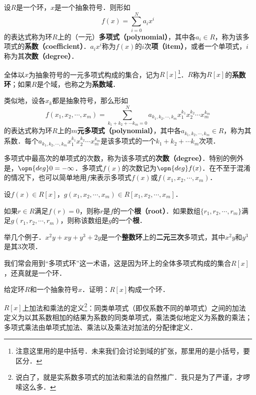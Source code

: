 \begin{definition}{}

设$R$是一个环，$x$是一个抽象符号．则形如
\begin{equation}
    f(x) = \sum_{i=0}^N a_i x^i
\end{equation}
的表达式称为环$R$上的（一元）\textbf{多项式（polynomial）}，其中各$a_i\in R$，称为该多项式的\textbf{系数（coefficient）}．$a_i x^i$称为$f(x)$的$i$次\textbf{项（item）}，或者一个单项式，$i$称为其\textbf{次数（degree）}．

全体以$x$为抽象符号的一元多项式构成的集合，记为$R[x]$\footnote{注意这里用的是中括号．未来我们会讨论到域的扩张，那里用的是小括号，要区分．}．$R$称为$R[x]$的\textbf{系数环}；如果$R$是个域，也称之为\textbf{系数域}．

类似地，设各$x_k$都是抽象符号，那么形如
\begin{equation}
    f(x_1, x_2, \cdots, x_m) = \sum_{k_1+k_2+\cdots k_m=0}^N a_{k_1, k_2, \cdots, k_m} x_1^{k_1}x_2^{k_2}\cdots x_m^{k_m}
\end{equation}
的表达式称为环$R$上的\textbf{$m$元多项式（polynomial）}，其中各$a_{k_1, k_2, \cdots, k_m}\in R$，称为其系数．每个$a_{k_1, k_2, \cdots, k_m} x_1^{k_1}x_2^{k_2}\cdots x_m^{k_m}$是该多项式的一个$k_1+k_2+\cdots k_m$次项．

多项式中最高次的单项式的次数，称为该多项式的\textbf{次数（degree）}．特别的例外是，$\opn{deg}0 = -\infty$．多项式$f(x)$的次数记为$\opn{deg} f(x)$．在不至于混淆的情况下，也可以简单地用$f$来表示多项式$f(x)$或$f(x_1, x_2, \cdots, x_m)$．

\end{definition}

\begin{definition}{}

设$f(x)\in R[x]$，$g(x_1, x_2, \cdots, x_m)\in R[x_1, x_2, \cdots, x_m]$．

如果$r\in R$满足$f(r)=0$，则称$r$是$f$的一个\textbf{根（root）}．如果数组$\{r_1, r_2, \cdots, r_m\}$满足$g(r_1, r_2, \cdots, r_m)$，则称该数组是$g$的一个\textbf{根}．

\end{definition}

举几个例子．$x^2y+xy+y^3+2y$是一个\textbf{整数环}上的\textbf{二元三次}多项式，其中$x^2y$和$y^3$是其$3$次项．

我们常会用到“多项式环”这一术语，这是因为环上的全体多项式构成的集合$R[x]$，还真就是一个环．

\begin{exercise}{}
给定环$R$和一个抽象符号$x$．证明：$R[x]$构成一个环．

$R[x]$上加法和乘法的定义\footnote{说白了，就是实系数多项式的加法和乘法的自然推广．我只是为了严谨，才啰嗦这么多．}：同类单项式（即仅系数不同的单项式）之间的加法定义为以其系数相加的结果为系数的同类单项式，乘法类似地定义为系数的乘法；多项式乘法由单项式加法、乘法以及乘法对加法的分配律定义．
\end{exercise}

